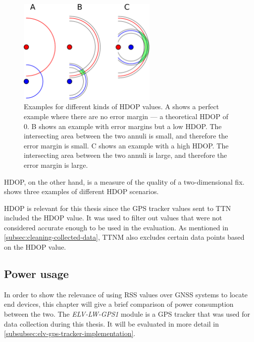 \begin{figure}[htbp]
    \centering
    \includegraphics[width=0.6\textwidth]{pictures/multilateration/Geometric_Dilution_Of_Precision.eps}
    \caption{
        Examples for different kinds of \ac{HDOP} values.
        A shows a perfect example where there are no error margin --- a theoretical \ac{HDOP} of 0.
        B shows an example with error margins but a low \ac{HDOP}.
        The intersecting area between the two annuli is small, and therefore the error margin is small.
        C shows an example with a high \ac{HDOP}.
        The intersecting area between the two annuli is large, and therefore the error margin is large.\cite{xoneca_english_2013}
    }\label{pic:hdop-example-diagram}
\end{figure}

\ac{HDOP}, on the other hand, is a measure of the quality of a two-dimensional fix.
 shows three examples of different \ac{HDOP} scenarios.

\ac{HDOP} is relevant for this thesis since the \ac{GPS} tracker values sent to \ac{TTN} included the \ac{HDOP} value.
It was used to filter out values that were not considered accurate enough to be used in the evaluation.
As mentioned in \cref{subsec:cleaning-collected-data}, \ac{TTNM} also excludes certain data points based on the \ac{HDOP} value.

\subsection{Power usage}\label{subsec:gnss-power-usage}

In order to show the relevance of using \ac{RSS} values over \ac{GNSS} systems to locate end devices, this chapter will give a brief comparison of power consumption between the two.
The \emph{ELV-LW-GPS1} module is a \ac{GPS} tracker that was used for data collection during this thesis.
It will be evaluated in more detail in \cref{subsubsec:elv-gps-tracker-implementation}.

